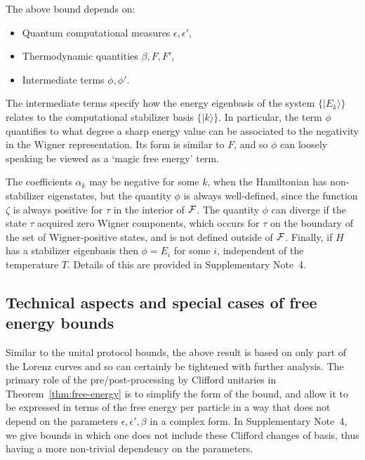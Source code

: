 \documentclass[
onecolumn,
superscriptaddress
]{revtex4-1}
\def\>{\rangle}
\def\F{{\cal F}}
\begin{document}
The above bound depends on: 
\begin{itemize}
\item Quantum computational measures $\epsilon, \epsilon'$,
\item Thermodynamic quantities $\beta, F, F',$
\item Intermediate terms $\phi, \phi'$. 
\end{itemize}
The intermediate terms specify how the energy eigenbasis of the system $\{|E_k\>\}$ relates to the computational stabilizer basis $\{|k\>\}$.  In particular, the term $\phi$ quantifies to what degree a sharp energy value can be associated to the negativity in the Wigner representation. Its form is similar to $F$, and so $\phi$ can loosely speaking be viewed as a `magic free energy' term. 

The coefficients $\alpha_k$ may be negative for some $k$, when the Hamiltonian has non-stabilizer eigenstates, but the quantity $\phi$ is always well-defined, since the function $\zeta$ is always positive for $\tau$ in the interior of $\F$. The quantity $\phi$ can diverge if the state $\tau$ acquired zero Wigner components, which occurs for $\tau$ on the boundary of the set of Wigner-positive states, and is not defined outside of $\F$. Finally, if $H$ has a stabilizer eigenbasis then $\phi = E_i$ for some $i$, independent of the temperature $T$. Details of this are provided in Supplementary Note~4.

\subsection*{Technical aspects and special cases of free energy bounds}

Similar to the unital protocol bounds, the above result is based on only part of the Lorenz curves and so can certainly be tightened with further analysis. The primary role of the pre/post-processing by Clifford unitaries in Theorem~\ref{thm:free-energy} is to simplify the form of the bound, and allow it to be expressed in terms of the free energy per particle in a way that does not depend on the parameters $\epsilon, \epsilon', \beta$ in a complex form. In Supplementary Note~4, we give bounds in which one does not include these Clifford changes of basis, thus having a more non-trivial dependency on the parameters.
\end{document}
